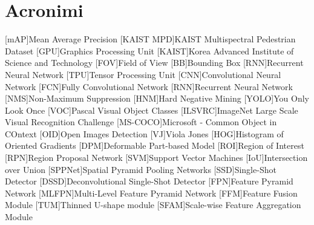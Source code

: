 \chapter*{Acronimi}
\begin{acronym}[CAGD]
    [mAP]{Mean Average Precision}
    [KAIST MPD]{KAIST Multispectral Pedestrian Dataset}
    [GPU]{Graphics Processing Unit}
    [KAIST]{Korea Advanced Institute of Science and Technology}
    [FOV]{Field of View}
    [BB]{Bounding Box}
    [RNN]{Recurrent Neural Network}
    [TPU]{Tensor Processing Unit}
    [CNN]{Convolutional Neural Network}
    [FCN]{Fully Convolutional Network}
    [RNN]{Recurrent Neural Network}
    [NMS]{Non-Maximum Suppression}
    [HNM]{Hard Negative Mining}
    [YOLO]{You Only Look Once}
    [VOC]{Pascal Visual Object Classes}
    [ILSVRC]{ImageNet Large Scale Visual Recognition Challenge}
    [MS-COCO]{Microsoft - Common Object in COntext}
    [OID]{Open Images Detection}
    [VJ]{Viola Jones}
    [HOG]{Histogram of Oriented Gradients}
    [DPM]{Deformable Part-based Model}
    [ROI]{Region of Interest}
    [RPN]{Region Proposal Network}
    [SVM]{Support Vector Machines}
    [IoU]{Intersection over Union}
    [SPPNet]{Spatial Pyramid Pooling Networks}
    [SSD]{Single-Shot Detector}
    [DSSD]{Deconvolutional Single-Shot Detector}
    [FPN]{Feature Pyramid Network}
    [MLFPN]{Multi-Level Feature Pyramid Network}
    [FFM]{Feature Fusion Module}
    [TUM]{Thinned U-shape module}
    [SFAM]{Scale-wise Feature Aggregation Module}
\end{acronym}
